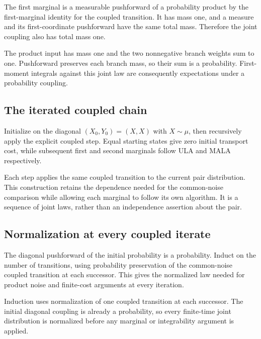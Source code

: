 \documentclass[11pt,a4paper]{report}
\begin{document}
The first marginal is a measurable pushforward of a probability product by the first-marginal identity for the coupled transition. It has mass one, and a measure and its first-coordinate pushforward have the same total mass. Therefore the joint coupling also has total mass one.



The product input has mass one and the two nonnegative branch weights sum to one. Pushforward preserves each branch mass, so their sum is a probability. First-moment integrals against this joint law are consequently expectations under a probability coupling.

\subsection{\texorpdfstring{The iterated coupled chain}{The iterated coupled chain}}
\label{report-step-UnadjustedLangevin-MALACoupling-lean-14}


Initialize on the diagonal \((X_0,Y_0)=(X,X)\) with \(X\sim\mu\), then recursively apply the explicit coupled step. Equal starting states give zero initial transport cost, while subsequent first and second marginals follow ULA and MALA respectively.



Each step applies the same coupled transition to the current pair distribution. This construction retains the dependence needed for the common-noise comparison while allowing each marginal to follow its own algorithm. It is a sequence of joint laws, rather than an independence assertion about the pair.

\subsection{\texorpdfstring{Normalization at every coupled iterate}{Normalization at every coupled iterate}}
\label{report-step-UnadjustedLangevin-MALACoupling-lean-15}


The diagonal pushforward of the initial probability is a probability. Induct on the number of transitions, using probability preservation of the common-noise coupled transition at each successor. This gives the normalized law needed for product noise and finite-cost arguments at every iteration.



Induction uses normalization of one coupled transition at each successor. The initial diagonal coupling is already a probability, so every finite-time joint distribution is normalized before any marginal or integrability argument is applied.
\end{document}

